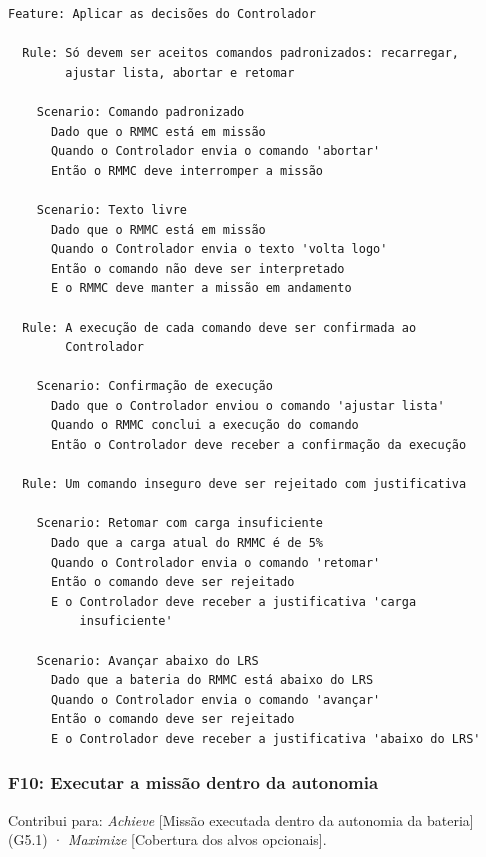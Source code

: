 \documentclass[a4paper, 12pt]{article}
\begin{document}
{\small
\begin{verbatim}
Feature: Aplicar as decisões do Controlador

  Rule: Só devem ser aceitos comandos padronizados: recarregar,
        ajustar lista, abortar e retomar

    Scenario: Comando padronizado
      Dado que o RMMC está em missão
      Quando o Controlador envia o comando 'abortar'
      Então o RMMC deve interromper a missão

    Scenario: Texto livre
      Dado que o RMMC está em missão
      Quando o Controlador envia o texto 'volta logo'
      Então o comando não deve ser interpretado
      E o RMMC deve manter a missão em andamento

  Rule: A execução de cada comando deve ser confirmada ao
        Controlador

    Scenario: Confirmação de execução
      Dado que o Controlador enviou o comando 'ajustar lista'
      Quando o RMMC conclui a execução do comando
      Então o Controlador deve receber a confirmação da execução

  Rule: Um comando inseguro deve ser rejeitado com justificativa

    Scenario: Retomar com carga insuficiente
      Dado que a carga atual do RMMC é de 5%
      Quando o Controlador envia o comando 'retomar'
      Então o comando deve ser rejeitado
      E o Controlador deve receber a justificativa 'carga
          insuficiente'

    Scenario: Avançar abaixo do LRS
      Dado que a bateria do RMMC está abaixo do LRS
      Quando o Controlador envia o comando 'avançar'
      Então o comando deve ser rejeitado
      E o Controlador deve receber a justificativa 'abaixo do LRS'
\end{verbatim}
}

\Needspace{8cm}
\subsubsection{F10: Executar a missão dentro da autonomia}

Contribui para: \textit{Achieve} [Missão executada dentro da autonomia da bateria] (G5.1) · \textit{Maximize} [Cobertura dos alvos opcionais].
\end{document}
